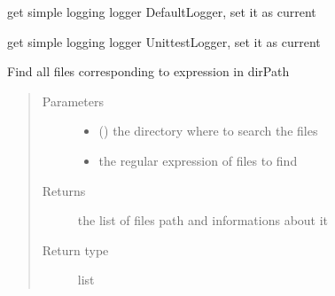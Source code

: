 \documentclass[a4paper,10pt,english]{sphinxmanual}
\begin{document}

\begin{fulllineitems}
\label{\detokenize{commands/apidoc/src:src.logger.getDefaultLogger}}
get simple logging logger DefaultLogger, set it as current

\end{fulllineitems}


\begin{fulllineitems}
\label{\detokenize{commands/apidoc/src:src.logger.getUnittestLogger}}
get simple logging logger UnittestLogger, set it as current

\end{fulllineitems}


\begin{fulllineitems}
\label{\detokenize{commands/apidoc/src:src.logger.isCurrentLoggerUnittest}}
\end{fulllineitems}


\begin{fulllineitems}
\label{\detokenize{commands/apidoc/src:src.logger.list_log_file}}
Find all files corresponding to expression in dirPath
\begin{quote}\begin{description}
\item[{Parameters}] \leavevmode\begin{itemize}
\item {} 
 () \textendash{} the directory where to search the files

\item {} 
 \textendash{} the regular expression of files to find

\end{itemize}

\item[{Returns}] \leavevmode
the list of files path and informations about it

\item[{Return type}] \leavevmode
list

\end{description}\end{quote}

\end{fulllineitems}
\end{document}
